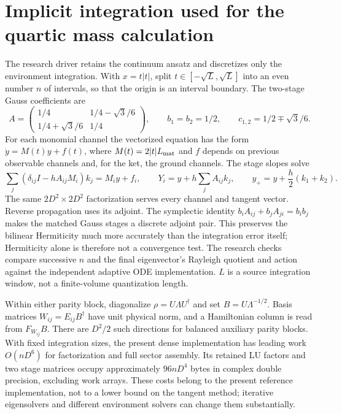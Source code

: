 \documentclass[11pt]{article}
\begin{document}
\section{Implicit integration used for the quartic mass calculation}
The research driver retains the continuum ansatz and discretizes only the
environment integration. With $x=t|t|$, split $t\in[-\sqrt{L},\sqrt{L}]$
into an even number $n$ of intervals, so that the origin is an interval
boundary. The two-stage Gauss coefficients are
\begin{equation}
 A=\begin{pmatrix}1/4&1/4-\sqrt{3}/6\\
                   1/4+\sqrt{3}/6&1/4\end{pmatrix},\qquad
 b_1=b_2=1/2,\qquad c_{1,2}=1/2\mp\sqrt{3}/6.
\end{equation}
For each monomial channel the vectorized equation has the form
$\dot y=M(t)y+f(t)$, where $M(t)=2|t|L_{\rm mat}$ and $f$ depends on
previous observable channels and, for the ket, the ground channels.
The stage slopes solve
\begin{equation}
 \sum_j(\delta_{ij}I-h A_{ij}M_i)k_j=M_i y+f_i,
 \qquad Y_i=y+h\sum_j A_{ij}k_j,\qquad
 y_+=y+\frac h2(k_1+k_2).
\end{equation}
The same $2D^2\times2D^2$ factorization serves every channel and tangent
vector. Reverse propagation uses its adjoint. The symplectic identity
$b_iA_{ij}+b_jA_{ji}=b_ib_j$ makes the matched Gauss stages a discrete
adjoint pair. This preserves the bilinear Hermiticity much more accurately
than the integration error itself; Hermiticity alone is therefore not a
convergence test. The research checks compare successive $n$ and the final
eigenvector's Rayleigh quotient and action against the independent adaptive
ODE implementation. $L$ is a source integration window, not a finite-volume
quantization length.

Within either parity block, diagonalize $\rho=U\Lambda U^\dagger$ and set
$B=U\Lambda^{-1/2}$. Basis matrices $W_{ij}=E_{ij}B^\dagger$ have unit
physical norm, and a Hamiltonian column is read from $F_{W_{ij}}B$.
There are $D^2/2$ such directions for balanced auxiliary parity blocks.
With fixed integration sizes, the present dense implementation has leading
work $O(nD^6)$ for factorization and full sector assembly. Its retained LU
factors and two stage matrices occupy approximately $96nD^4$ bytes in
complex double precision, excluding work arrays. These costs belong to the
present reference implementation, not to a lower bound on the tangent
method; iterative eigensolvers and different environment solvers can change
them substantially.
\end{document}
